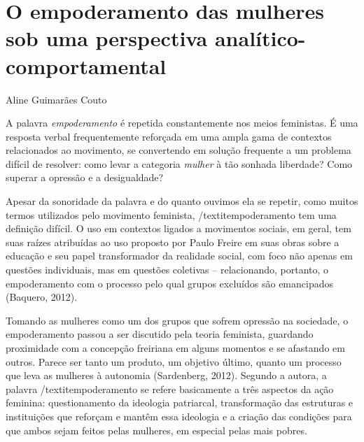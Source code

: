 \chapter{O empoderamento das mulheres sob uma perspectiva analítico-comportamental}
\begin{flushright}
\begin{scriptsize}
    Aline Guimarães Couto
\end{scriptsize}
\vspace{1cm}
\end{flushright}

A palavra \textit{empoderamento} é repetida constantemente nos meios feministas. É uma resposta verbal frequentemente reforçada em uma ampla gama de contextos relacionados ao movimento, se convertendo em solução frequente a um problema difícil de resolver: como levar a categoria \textit{mulher} à tão sonhada liberdade? Como superar a opressão e a desigualdade?

Apesar da sonoridade da palavra e do quanto ouvimos ela se repetir, como muitos termos utilizados pelo movimento feminista, /textit{empoderamento} tem uma definição difícil. O uso em contextos ligados a movimentos sociais, em geral, tem suas raízes atribuídas ao uso proposto por Paulo Freire em suas obras sobre a educação e seu papel transformador da realidade social, com foco não apenas em questões individuais, mas em questões coletivas – relacionando, portanto, o empoderamento com o processo pelo qual grupos excluídos são emancipados (Baquero, 2012).

Tomando as mulheres como um dos grupos que sofrem opressão na sociedade, o empoderamento passou a ser discutido pela teoria feminista, guardando proximidade com a concepção freiriana em alguns momentos e se afastando em outros. Parece ser tanto um produto, um objetivo último, quanto um processo que leva as mulheres à autonomia (Sardenberg, 2012). Segundo a autora, a palavra /textit{empoderamento} se refere basicamente a três aspectos da ação feminina: questionamento da ideologia patriarcal, transformação das estruturas e instituições que reforçam e mantêm essa ideologia e a criação das condições para que ambos sejam feitos pelas mulheres, em especial pelas mais pobres. 

